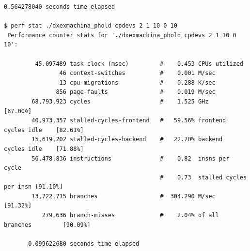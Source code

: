 \documentclass[8pt,a4paper]{report}
\begin{document}
\begin{Verbatim}[fontsize=\small]
       0.564278040 seconds time elapsed
       
$ perf stat ./dxexmachina_phold cpdevs 2 1 10 0 10
 Performance counter stats for './dxexmachina_phold cpdevs 2 1 10 0 10':

         45.097489 task-clock (msec)         #    0.453 CPUs utilized          
                46 context-switches          #    0.001 M/sec                  
                13 cpu-migrations            #    0.288 K/sec                  
               856 page-faults               #    0.019 M/sec                  
        68,793,923 cycles                    #    1.525 GHz                     [67.00%]
        40,973,357 stalled-cycles-frontend   #   59.56% frontend cycles idle    [82.61%]
        15,619,202 stalled-cycles-backend    #   22.70% backend  cycles idle    [71.88%]
        56,478,836 instructions              #    0.82  insns per cycle        
                                             #    0.73  stalled cycles per insn [91.10%]
        13,722,715 branches                  #  304.290 M/sec                   [91.32%]
           279,636 branch-misses             #    2.04% of all branches         [90.09%]

       0.099622680 seconds time elapsed
\end{Verbatim}
\end{document}
